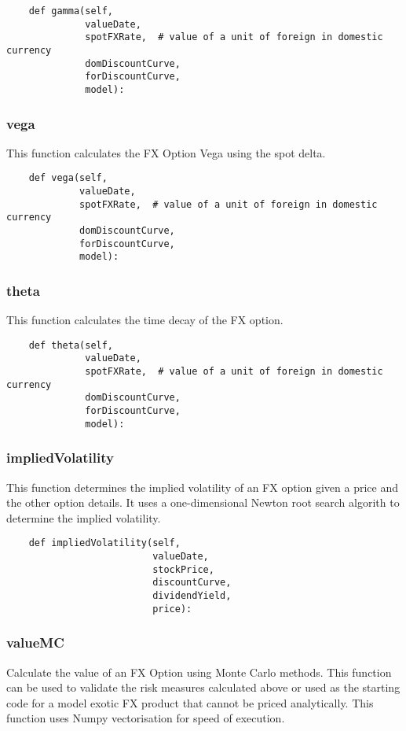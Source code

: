 \documentclass[twoside,11pt]{book}
\begin{document}
\begin{lstlisting}
    def gamma(self,
              valueDate,
              spotFXRate,  # value of a unit of foreign in domestic currency
              domDiscountCurve,
              forDiscountCurve,
              model):
\end{lstlisting}

\subsubsection*{{\bf vega}}
This function calculates the FX Option Vega using the spot delta.  

\begin{lstlisting}
    def vega(self,
             valueDate,
             spotFXRate,  # value of a unit of foreign in domestic currency
             domDiscountCurve,
             forDiscountCurve,
             model):
\end{lstlisting}

\subsubsection*{{\bf theta}}
This function calculates the time decay of the FX option.  

\begin{lstlisting}
    def theta(self,
              valueDate,
              spotFXRate,  # value of a unit of foreign in domestic currency
              domDiscountCurve,
              forDiscountCurve,
              model):
\end{lstlisting}

\subsubsection*{{\bf impliedVolatility}}
This function determines the implied volatility of an FX option given a price and the other option details. It uses a one-dimensional Newton root search algorith to determine the implied volatility.  

\begin{lstlisting}
    def impliedVolatility(self,
                          valueDate,
                          stockPrice,
                          discountCurve,
                          dividendYield,
                          price):
\end{lstlisting}

\subsubsection*{{\bf valueMC}}
Calculate the value of an FX Option using Monte Carlo methods. This function can be used to validate the risk measures calculated above or used as the starting code for a model exotic FX product that cannot be priced analytically. This function uses Numpy vectorisation for speed of execution. 
\end{document}

